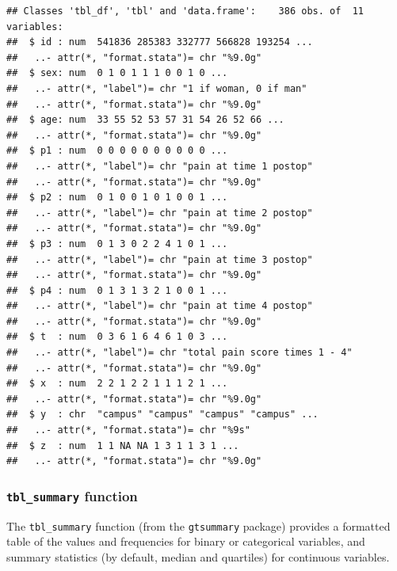 \documentclass[]{book}
\newenvironment{Shaded}{\begin{snugshade}}{\end{snugshade}}
\newcommand{\CommentTok}[1]{\textcolor[rgb]{0.56,0.35,0.01}{\textit{#1}}}
\newcommand{\KeywordTok}[1]{\textcolor[rgb]{0.13,0.29,0.53}{\textbf{#1}}}
\newcommand{\NormalTok}[1]{#1}
\newcommand{\OperatorTok}[1]{\textcolor[rgb]{0.81,0.36,0.00}{\textbf{#1}}}
\newcommand{\StringTok}[1]{\textcolor[rgb]{0.31,0.60,0.02}{#1}}
\begin{document}
\begin{verbatim}
## Classes 'tbl_df', 'tbl' and 'data.frame':    386 obs. of  11 variables:
##  $ id : num  541836 285383 332777 566828 193254 ...
##   ..- attr(*, "format.stata")= chr "%9.0g"
##  $ sex: num  0 1 0 1 1 1 0 0 1 0 ...
##   ..- attr(*, "label")= chr "1 if woman, 0 if man"
##   ..- attr(*, "format.stata")= chr "%9.0g"
##  $ age: num  33 55 52 53 57 31 54 26 52 66 ...
##   ..- attr(*, "format.stata")= chr "%9.0g"
##  $ p1 : num  0 0 0 0 0 0 0 0 0 0 ...
##   ..- attr(*, "label")= chr "pain at time 1 postop"
##   ..- attr(*, "format.stata")= chr "%9.0g"
##  $ p2 : num  0 1 0 0 1 0 1 0 0 1 ...
##   ..- attr(*, "label")= chr "pain at time 2 postop"
##   ..- attr(*, "format.stata")= chr "%9.0g"
##  $ p3 : num  0 1 3 0 2 2 4 1 0 1 ...
##   ..- attr(*, "label")= chr "pain at time 3 postop"
##   ..- attr(*, "format.stata")= chr "%9.0g"
##  $ p4 : num  0 1 3 1 3 2 1 0 0 1 ...
##   ..- attr(*, "label")= chr "pain at time 4 postop"
##   ..- attr(*, "format.stata")= chr "%9.0g"
##  $ t  : num  0 3 6 1 6 4 6 1 0 3 ...
##   ..- attr(*, "label")= chr "total pain score times 1 - 4"
##   ..- attr(*, "format.stata")= chr "%9.0g"
##  $ x  : num  2 2 1 2 2 1 1 1 2 1 ...
##   ..- attr(*, "format.stata")= chr "%9.0g"
##  $ y  : chr  "campus" "campus" "campus" "campus" ...
##   ..- attr(*, "format.stata")= chr "%9s"
##  $ z  : num  1 1 NA NA 1 3 1 1 3 1 ...
##   ..- attr(*, "format.stata")= chr "%9.0g"
\end{verbatim}

\hypertarget{tbl_summary-function}{%
\subsubsection{\texorpdfstring{\texttt{tbl\_summary}
function}{tbl\_summary function}}\label{tbl_summary-function}}

The \texttt{tbl\_summary} function (from the \texttt{gtsummary} package)
provides a formatted table of the values and frequencies for binary or
categorical variables, and summary statistics (by default, median and
quartiles) for continuous variables.

\begin{Shaded}
\end{Shaded}
\end{document}
